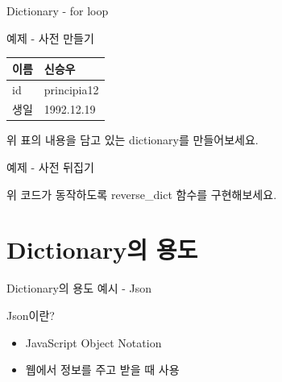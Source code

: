 \documentclass{beamer}
\newenvironment{slide}[1][]
{%
  \begin{frame}[allowframebreaks,#1]%
  }{%
  \end{frame}%
}
\newcommand{\python}[2]{} %
\begin{document}
\begin{slide}[fragile, environment=slide]{Dictionary - for loop} 
\python{iter_dict.py}{사전형 다루기}
\end{slide}

\begin{slide}[fragile, environment=slide]{예제 - 사전 만들기} 
\begin{table}[인적사항]
\begin{tabular}{|l|l|}
\hline
이름 & 신승우         \\ \hline
id & principia12 \\ \hline
생일 & 1992.12.19  \\ \hline
\end{tabular}
\end{table}
위 표의 내용을 담고 있는 dictionary를 만들어보세요. 
\end{slide}


\begin{slide}[fragile, environment=slide]{예제 - 사전 뒤집기} 
\python{example.py}{사전 뒤집기}
위 코드가 동작하도록 reverse\_dict 함수를 구현해보세요. 
\end{slide}





\section{Dictionary의 용도} 

\begin{slide}[fragile, environment=slide]{Dictionary의 용도 예시  -  Json} 

Json이란? 
\begin{itemize} 
\item JavaScript Object Notation 
\item 웹에서 정보를 주고 받을 때 사용 
\end{itemize}

\end{slide}
\end{document}
